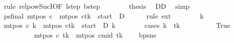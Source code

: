 \begin{isabellebody}
\ {\isacharparenleft}{\kern0pt}rule\ relpow{\isacharunderscore}{\kern0pt}Suc{\isacharunderscore}{\kern0pt}I{\isacharbrackleft}{\kern0pt}OF\ lstep\ bstep{\isacharbrackright}{\kern0pt}{\isacharparenright}{\kern0pt}\isanewline
\ \ \ \ \ \ \isamarkupfalse%
\ {\isacharquery}{\kern0pt}thesis\ \isamarkupfalse%
\ DD\ \isamarkupfalse%
\ simp\isanewline
\ \ \ \ \isamarkupfalse%
\isanewline
\ \ \ \ \isamarkupfalse%
\ ps{\isacharunderscore}{\kern0pt}final{\isacharcolon}{\kern0pt}\ {\isachardoublequoteopen}mt{\isacharunderscore}{\kern0pt}pos\ c{\isacharprime}{\kern0pt}\ {\isacharequal}{\kern0pt}\ {\isacharparenleft}{\kern0pt}mt{\isacharunderscore}{\kern0pt}pos\ c{}{\isacharparenright}{\kern0pt}{\isacharparenleft}{\kern0pt}tk\ {\isacharcolon}{\kern0pt}{\isacharequal}{\kern0pt}\ {\isacharquery}{\kern0pt}start\ {\isacharminus}{\kern0pt}\ {\isacharquery}{\kern0pt}D{\isacharparenright}{\kern0pt}{\isachardoublequoteclose}\isanewline
\ \ \ \ \isamarkupfalse%
\ {\isacharparenleft}{\kern0pt}rule\ ext{\isacharparenright}{\kern0pt}\isanewline
\ \ \ \ \ \ \isamarkupfalse%
\ k{\isacharprime}{\kern0pt}\isanewline
\ \ \ \ \ \ \isamarkupfalse%
\ {\isachardoublequoteopen}mt{\isacharunderscore}{\kern0pt}pos\ c{\isacharprime}{\kern0pt}\ k{\isacharprime}{\kern0pt}\ {\isacharequal}{\kern0pt}\ {\isacharparenleft}{\kern0pt}{\isacharparenleft}{\kern0pt}mt{\isacharunderscore}{\kern0pt}pos\ c{}{\isacharparenright}{\kern0pt}{\isacharparenleft}{\kern0pt}tk\ {\isacharcolon}{\kern0pt}{\isacharequal}{\kern0pt}\ {\isacharquery}{\kern0pt}start\ {\isacharminus}{\kern0pt}\ {\isacharquery}{\kern0pt}D{\isacharparenright}{\kern0pt}{\isacharparenright}{\kern0pt}\ k{\isacharprime}{\kern0pt}{\isachardoublequoteclose}\isanewline
\ \ \ \ \ \ \isamarkupfalse%
\ {\isacharparenleft}{\kern0pt}cases\ {\isachardoublequoteopen}k{\isacharprime}{\kern0pt}\ {\isacharequal}{\kern0pt}\ tk{\isachardoublequoteclose}{\isacharparenright}{\kern0pt}\isanewline
\ \ \ \ \ \ \ \ \isamarkupfalse%
\ True\isanewline
\ \ \ \ \ \ \ \ \isamarkupfalse%
\ {\isachardoublequoteopen}mt{\isacharunderscore}{\kern0pt}pos\ c{\isacharprime}{\kern0pt}\ tk\ {\isacharequal}{\kern0pt}\ mt{\isacharunderscore}{\kern0pt}pos\ cmid\ tk\ {\isacharminus}{\kern0pt}\ {}{\isachardoublequoteclose}\ \isamarkupfalse%
\ bps{\isacharunderscore}{\kern0pt}ne\ \isamarkupfalse%

\end{isabellebody}
